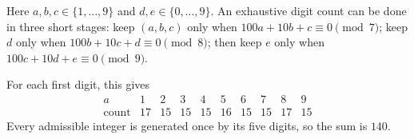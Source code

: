 Here $a,b,c\in\{1,\ldots,9\}$ and $d,e\in\{0,\ldots,9\}$. An exhaustive digit count can be done in three short stages: keep $(a,b,c)$ only when $100a+10b+c\equiv0\pmod7$; keep $d$ only when $100b+10c+d\equiv0\pmod8$; then keep $e$ only when $100c+10d+e\equiv0\pmod9$.

For each first digit, this gives
\[
\begin{array}{c|rrrrrrrrr}
a&1&2&3&4&5&6&7&8&9\\\hline
\text{count}&17&15&15&15&16&15&15&17&15
\end{array}
\]
Every admissible integer is generated once by its five digits, so the sum is $\boxed{140}$.
